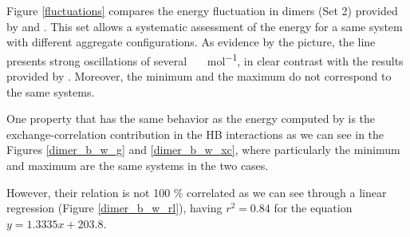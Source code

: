 \newpage

Figure \ref{fluctuations} compares the energy fluctuation in dimers (Set 2)
provided by {} and {}. This set allows a systematic
assessment of the energy for a same system with different aggregate
configurations. As evidence by the picture, the {} line presents
strong oscillations of several \SI{}{\kilo\calorie\per\mole}, in clear contrast
with the results provided by {}. Moreover, the minimum and the
maximum do not correspond to the same systems.

One property that has the same behavior as the energy computed by
{} is the exchange-correlation contribution in the
HB interactions as we can see in the Figures \ref{dimer_b_w_g} and
\ref{dimer_b_w_xc}, where particularly the minimum and maximum are the same
systems in the two cases.

However, their relation is not 100 \% correlated as we can see through
a linear regression (Figure \ref{dimer_b_w_rl}), having $r^2 = 0.84$
for the equation
$y = 1.3335x + 203.8$.

